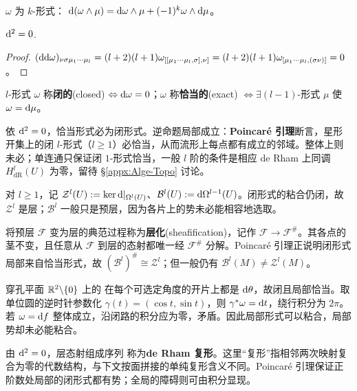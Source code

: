 \begin{theorem}[Leibniz 律]$\omega$ 为 $k$-形式：
    $\dd(\omega\wedge\mu)=\dd\omega\wedge\mu+(-1)^k\omega\wedge\dd\mu$。
\end{theorem}

\begin{theorem} $\dd^2=0$.
\end{theorem}
\begin{proof} $(\dd\dd\omega)_{\nu\sigma\mu_1\cdots\mu_l}=(l+2)(l+1)\omega_{[[\mu_1\cdots\mu_l,\sigma],\nu]}=(l+2)(l+1)\omega_{[\mu_1\cdots\mu_l,(\sigma\nu)]}=0$。
\end{proof}

\begin{definition}
    $l$-形式 $\omega$ 称\textbf{闭的}(closed) $\Leftrightarrow\dd\omega=0$；$\omega$ 称\textbf{恰当的}(exact) $\Leftrightarrow \exists (l-1)$-形式 $\mu$ 使 $\omega=\dd\mu$。
\end{definition}
依 $\dd^2=0$，恰当形式必为闭形式。逆命题局部成立：\textbf{Poincaré 引理}断言，星形开集上的闭 $l$-形式（$l\geqslant1$）必恰当，从而流形上每点都有成立的邻域。整体上则未必；单连通只保证闭 $1$-形式恰当，一般 $l$ 阶的条件是相应 de Rham 上同调 $H^l_{\mathrm{dR}}(U)$ 为零，留待 \S\ref{appx:Alge-Topo} 讨论。

\begin{remark}\label{rem:sheafification-forms}
    对 $l\geqslant1$，记 $\mathcal Z^l(U):=\ker\dd|_{\Omega^l(U)}$、$\mathcal B^l(U):=\dd\Omega^{l-1}(U)$。闭形式的粘合仍闭，故 $\mathcal Z^l$ 是层；$\mathcal B^l$ 一般只是预层，因为各片上的势未必能相容地选取。

    将预层 $\mathcal F$ 变为层的典范过程称为\textbf{层化}(sheafification)，记作 $\mathcal F\to\mathcal F^\#$。其各点的茎不变，且任意从 $\mathcal F$ 到层的态射都唯一经 $\mathcal F^\#$ 分解。Poincaré 引理正说明闭形式局部来自恰当形式，故 $(\mathcal B^l)^\#\cong\mathcal Z^l$；但一般仍有 $\mathcal B^l(M)\ne\mathcal Z^l(M)$。
\end{remark}

\begin{example}\label{eg:local-potential-period}
    穿孔平面 $\mathbb{R}^2\backslash\{0\}$ 上的
    在每个可选定角度的开片上都是 $\dd\theta$，故闭且局部恰当。取单位圆的逆时针参数化 $\gamma(t)=(\cos t,\sin t)$，则 $\gamma^*\omega=\dd t$，绕行积分为 $2\pi$。若 $\omega=\dd f$ 整体成立，沿闭路的积分应为零，矛盾。因此局部形式可以粘合，局部势却未必能粘合。
\end{example}

由 $\dd^2=0$，层态射组成序列
称为\textbf{de Rham 复形}。这里“复形”指相邻两次映射复合为零的代数结构，与下文按面拼接的单纯复形含义不同。Poincaré 引理保证正阶数处局部的闭形式都有势；全局的障碍则可由积分显现。

